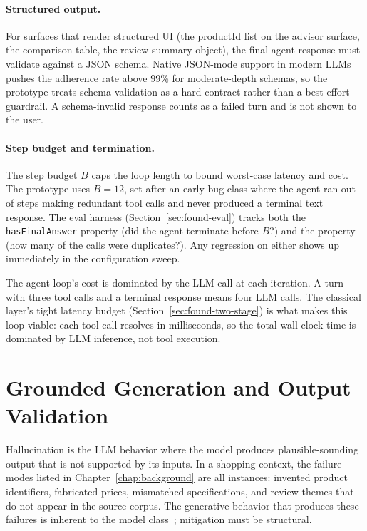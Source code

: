 \paragraph{Structured output.} For surfaces that render
structured UI (the productId list on the advisor surface, the
comparison table, the review-summary object), the final agent
response must validate against a JSON schema. Native JSON-mode
support in modern LLMs~\cite{StructuredOutput2024} pushes the
adherence rate above 99\% for moderate-depth schemas, so the
prototype treats schema validation as a hard contract rather than
a best-effort guardrail. A schema-invalid response counts as a
failed turn and is not shown to the user.

\paragraph{Step budget and termination.} The step budget $B$ caps
the loop length to bound worst-case latency and cost. The
prototype uses $B = 12$, set after an early bug class where the
agent ran out of steps making redundant tool calls and never
produced a terminal text response. The eval harness
(Section~\ref{sec:found-eval}) tracks both the
\texttt{hasFinalAnswer} property (did the agent terminate before
$B$?) and the  property (how many of
the calls were duplicates?). Any regression on either shows
up immediately in the configuration sweep.

The agent loop's cost is dominated by the LLM call at each
iteration. A turn with three tool calls and a terminal response
means four LLM calls. The classical layer's tight latency budget
(Section~\ref{sec:found-two-stage}) is what makes this loop
viable: each tool call resolves in milliseconds, so the total
wall-clock time is dominated by LLM inference, not tool
execution.

\section{Grounded Generation and Output Validation}
\label{sec:found-grounding}

Hallucination is the LLM behavior where the model produces
plausible-sounding output that is not supported by its inputs. In
a shopping context, the failure modes listed in
Chapter~\ref{chap:background} are all instances: invented product
identifiers, fabricated prices, mismatched specifications, and
review themes that do not appear in the source corpus. The
generative behavior that produces these failures is inherent to
the model class~\cite{HallucinationSurvey2023}; mitigation must
be structural.

